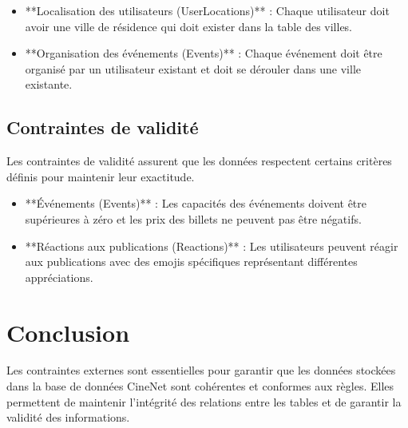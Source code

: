 \begin{itemize}
    \item **Localisation des utilisateurs (UserLocations)** : Chaque utilisateur doit avoir une ville de résidence qui doit exister dans la table des villes.
    \item **Organisation des événements (Events)** : Chaque événement doit être organisé par un utilisateur existant et doit se dérouler dans une ville existante.
\end{itemize}

\subsection*{Contraintes de validité}

Les contraintes de validité assurent que les données respectent certains critères définis pour maintenir leur exactitude.

\begin{itemize}
    \item **Événements (Events)** : Les capacités des événements doivent être supérieures à zéro et les prix des billets ne peuvent pas être négatifs.
    \item **Réactions aux publications (Reactions)** : Les utilisateurs peuvent réagir aux publications avec des emojis spécifiques représentant différentes appréciations.
\end{itemize}

\section*{Conclusion}

Les contraintes externes sont essentielles pour garantir que les données stockées dans la base de données CineNet sont cohérentes et conformes aux règles. Elles permettent de maintenir l'intégrité des relations entre les tables et de garantir la validité des informations.

